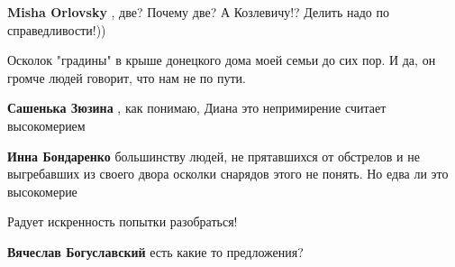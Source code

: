 \begin{itemize}
\begin{itemize}
\textbf{Misha Orlovsky} , две? Почему две? А Козлевичу!?
Делить надо по справедливости!))

\end{itemize}

 
Осколок "градины" в крыше донецкого дома моей семьи до сих пор. И да, он громче
людей говорит, что нам не по пути.

\begin{itemize}
 
\textbf{Сашенька Зюзина} , как понимаю, Диана это непримирение считает высокомерием

 
\textbf{Инна Бондаренко} большинству людей, не прятавшихся от обстрелов и не выгребавших
из своего двора осколки снарядов этого не понять. Но едва ли это высокомерие
\end{itemize}

 
Радует искренность попытки разобраться!

\begin{itemize}
 
\textbf{Вячеслав Богуславский} есть какие то предложения?

 

\end{itemize}
\end{itemize}

